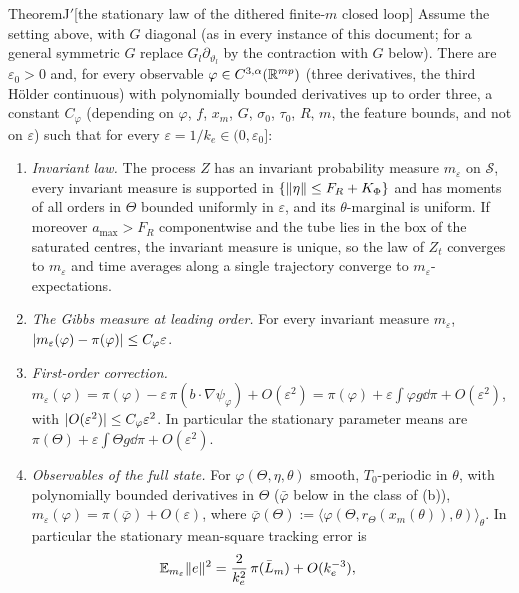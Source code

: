 \begin{thm}{Theorem}{J$'$}[the stationary law of the dithered finite-$m$ closed loop]
Assume the setting above, with $G$ diagonal (as in every instance of this document; for a general symmetric $G$
replace $G_l\partial_{\vartheta_l}$ by the contraction with $G$ below). There are $\varepsilon_0 > 0$ and, for every
observable $\varphi\in C^{3,\alpha}(\mathbb{R}^{mp})$ (three derivatives, the third H\"older continuous) with polynomially
bounded derivatives up to order three, a constant $C_\varphi$ (depending on $\varphi$, $f$, $x_m$, $G$, $\sigma_0$,
$\tau_0$, $R$, $m$, the feature bounds, and not on $\varepsilon$) such that for every
$\varepsilon = 1/k_e\in(0,\varepsilon_0]$:
\begin{enumerate}[label=\textup{(\alph*)}]
  \item \emph{Invariant law.} The process $Z$ has an invariant probability measure $m_\varepsilon$ on $\mathcal{S}$,
    every invariant measure is supported in $\{\lVert \eta\rVert\le F_R + K_\Phi\}$ and has moments of all orders in
    $\Theta$ bounded uniformly in $\varepsilon$, and its $\theta$-marginal is uniform. If moreover $a_{\max} > F_R$
    componentwise and the tube lies in the box of the saturated centres, the invariant measure is unique, so the law
    of $Z_t$ converges to $m_\varepsilon$ and time averages along a single trajectory converge to
    $m_\varepsilon$-expectations.
  \item \emph{The Gibbs measure at leading order.} For every invariant measure $m_\varepsilon$,
    $\lvert m_\varepsilon(\varphi) - \pi(\varphi)\rvert\le C_\varphi\varepsilon$.
  \item \emph{First-order correction.}
    $m_\varepsilon(\varphi) = \pi(\varphi) - \varepsilon\,\pi(b\cdot\nabla\psi_\varphi) + O(\varepsilon^2)
    = \pi(\varphi) + \varepsilon\int\varphi g\dd\pi + O(\varepsilon^2)$, with
    $\lvert O(\varepsilon^2)\rvert\le C_\varphi\varepsilon^2$. In particular the stationary parameter means are
    $\pi(\Theta) + \varepsilon\int\Theta g\dd\pi + O(\varepsilon^2)$.
  \item \emph{Observables of the full state.} For $\varphi(\Theta,\eta,\theta)$ smooth, $T_0$-periodic in $\theta$,
    with polynomially bounded derivatives in $\Theta$ ($\bar\varphi$ below in the class of \textup{(b)}),
    $m_\varepsilon(\varphi) = \pi(\bar\varphi) + O(\varepsilon)$, where
    $\bar\varphi(\Theta) := \langle\varphi(\Theta,r_\Theta(x_m(\theta)),\theta)\rangle_\theta$. In particular the
    stationary mean-square tracking error is
    \[
      \mathbb{E}_{m_\varepsilon}\lVert e\rVert^2 = \frac{2}{k_e^2}\,\pi(\bar L_m) + O(k_e^{-3}),\qquad
\]
\end{enumerate}
\end{thm}
